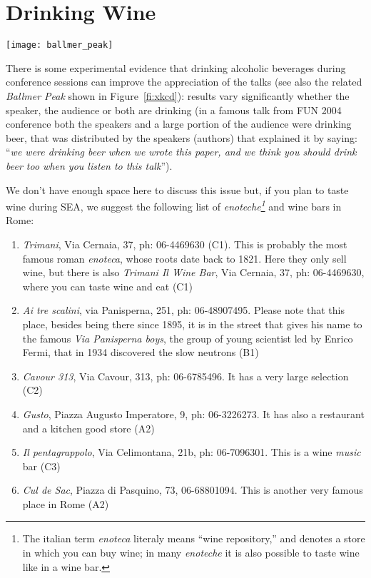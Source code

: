 \documentclass[twocolumn,10pt]{article}
\newcommand{\conference}{SEA\xspace}
\begin{document}
\section{Drinking Wine}

\begin{figure*}[t!]
\begin{center}
\texttt{[image: ballmer\_peak]}
\end{center}
\caption{A study on the relation between blood alcohol concentration and programming skills (from \texttt{xcdc.com}).\label{fi:xkcd}}\vspace{-4mm}
\end{figure*}

There is some experimental evidence that drinking alcoholic beverages during conference sessions can improve the appreciation of the talks (see also the related \emph{Ballmer Peak} shown in Figure~\ref{fi:xkcd}): results vary significantly whether the speaker, the audience or both are drinking (in a famous talk from FUN 2004 conference both the speakers and a large portion of the audience were drinking beer, that was distributed by the speakers (authors) that explained it by saying: ``\emph{we were drinking beer when we wrote this paper, and we think you should drink beer too when you listen to this talk}'').

We don't have enough space here to discuss this issue but, if you plan
to taste wine during \conference, we suggest the following list of
\emph{enoteche\footnote{The italian term \emph{enoteca} literaly means
  ``wine repository,'' and denotes a store in which you can buy wine; in many \emph{enoteche} it is also possible to taste wine like in a wine bar.}} and wine bars in Rome:
\begin{enumerate}
\item[W1] \emph{Trimani}, Via Cernaia, 37, ph: 06-4469630 (C1). This is probably the most famous roman \emph{enoteca}, whose roots date back to 1821. Here they only sell wine, but there is also \emph{Trimani Il Wine Bar}, Via Cernaia, 37, ph: 06-4469630, where you can taste wine and eat (C1)
\item[W2] \emph{Ai tre scalini}, via Panisperna, 251, ph: 06-48907495. Please note that this place, besides being there since 1895, it is in the street that gives his name to the famous \emph{Via Panisperna boys}, the group of young scientist led by Enrico Fermi, that in 1934 discovered the slow neutrons (B1)
\item[W3] \emph{Cavour 313}, Via Cavour, 313, ph: 06-6785496‎. It has a very large selection (C2)
\item[W4] \emph{Gusto}, Piazza Augusto Imperatore, 9, ph: 06-3226273. It has also a restaurant and a kitchen good store (A2)
\item[W5] \emph{Il pentagrappolo}, Via Celimontana, 21b, ph: 06-7096301. This is a wine \emph{music} bar (C3)
\item[W6] \emph{Cul de Sac}, Piazza di Pasquino, 73, 06-68801094. This is another very famous place in Rome (A2)
\end{enumerate}
\end{document}
